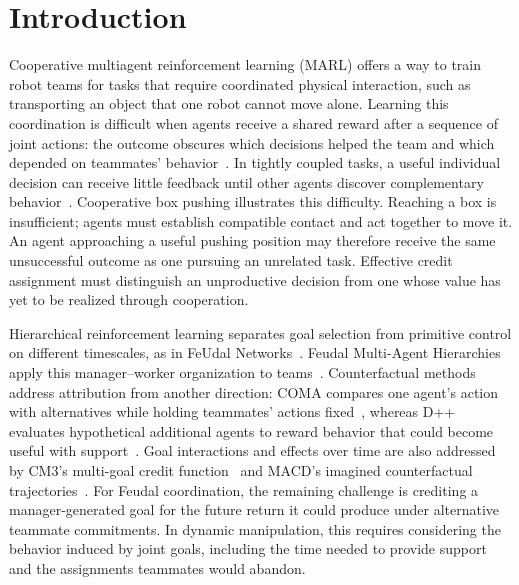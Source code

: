 \section{Introduction}
\label{sec:introduction}

Cooperative multiagent reinforcement learning (MARL) offers a way to train
robot teams for tasks that require coordinated physical interaction, such as
transporting an object that one robot cannot move alone. Learning this
coordination is difficult when agents receive a shared reward after a sequence
of joint actions: the outcome obscures which decisions helped the team and
which depended on teammates' behavior~\cite{foerster2018coma}. In tightly
coupled tasks, a useful individual decision can receive little feedback until
other agents discover complementary behavior~\cite{rahmattalabi2016dpp}.
Cooperative box pushing illustrates this difficulty. Reaching a box is
insufficient; agents must establish compatible contact and act together to
move it. An agent approaching a useful pushing position may therefore receive
the same unsuccessful outcome as one pursuing an unrelated task. Effective
credit assignment must distinguish an unproductive decision from one whose
value has yet to be realized through cooperation.

Hierarchical reinforcement learning separates goal selection from primitive
control on different timescales, as in FeUdal
Networks~\cite{vezhnevets2017fun}. Feudal Multi-Agent Hierarchies apply this
manager--worker organization to teams~\cite{ahilan2019fmh}.
Counterfactual methods address attribution from another direction: COMA
compares one agent's action with alternatives while holding teammates' actions
fixed~\cite{foerster2018coma}, whereas D++ evaluates hypothetical additional
agents to reward behavior that could become useful with
support~\cite{rahmattalabi2016dpp}. Goal interactions and effects over time
are also addressed by CM3's multi-goal credit function~\cite{yang2020cm3} and
MACD's imagined counterfactual trajectories~\cite{chai2024macd}. For Feudal
coordination, the remaining challenge is crediting a manager-generated goal
for the future return it could produce under alternative teammate commitments.
In dynamic manipulation, this requires considering the behavior induced by
joint goals, including the time needed to provide support and the assignments
teammates would abandon.

